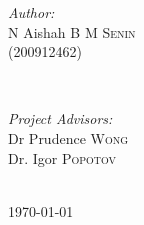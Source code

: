 \documentclass[12pt,a4paper,oneside]{report}
\begin{document}
\begin{titlepage}
\begin{minipage}{0.4\textwidth}
\begin{flushleft} \large
\emph{Author:}\\
N Aishah \textsc{B M Senin} \\ (200912462) %
\end{flushleft}
\end{minipage}
~
\begin{minipage}{0.4\textwidth}
\begin{flushright} \large
\emph{Project Advisors:} \\
Dr Prudence \textsc{Wong} \\
Dr. Igor \textsc{Popotov} %
\end{flushright}
\end{minipage}\\[2cm]



{\large \today}\\[3cm] %


 

\vfill %

\end{titlepage}

\tableofcontents







\printbibliography[heading=secbib]
\end{document}
